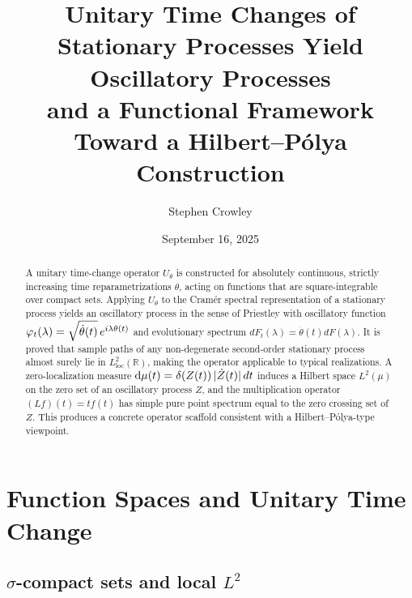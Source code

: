 \documentclass{article}
\newcommand{\mathd}{\mathrm{d}}
\newcommand{\tmop}[1]{\ensuremath{\operatorname{#1}}}
\begin{document}
\title{
  Unitary Time Changes of Stationary Processes Yield Oscillatory Processes\\
  and a Functional Framework Toward a Hilbert--P{\'o}lya Construction
}

\author{Stephen Crowley}

\date{September 16, 2025}

\maketitle

\begin{abstract}
  A unitary time-change operator $U_{\theta}$ is constructed for absolutely
  continuous, strictly increasing time reparametrizations $\theta$, acting on
  functions that are square-integrable over compact sets. Applying
  $U_{\theta}$ to the Cram{\'e}r spectral representation of a stationary
  process yields an oscillatory process in the sense of Priestley with
  oscillatory function $\varphi_t (\lambda) = \sqrt{\dot{\theta} (t)} 
  \hspace{0.17em} e^{i \lambda \theta (t)}$ and evolutionary spectrum $dF_t
  (\lambda) = \dot{\theta} (t) dF (\lambda)$. It is proved that sample paths
  of any non-degenerate second-order stationary process almost surely lie in
  $L^2_{\tmop{loc}} (\mathbb{R})$, making the operator applicable to typical
  realizations. A zero-localization measure $\mathd \mu (t) = \delta (Z (t))
  \hspace{0.17em} | \dot{Z} (t) |  \hspace{0.17em} dt$ induces a Hilbert space
  $L^2 (\mu)$ on the zero set of an oscillatory process $Z$, and the
  multiplication operator $(Lf) (t) = tf (t)$ has simple pure point spectrum
  equal to the zero crossing set of $Z$. This produces a concrete operator
  scaffold consistent with a Hilbert--P{\'o}lya-type viewpoint.
\end{abstract}

{\tableofcontents}

\section{Function Spaces and Unitary Time Change}\label{sec:functionspaces}

\subsection{$\sigma$-compact sets and local $L^2$}
\end{document}
